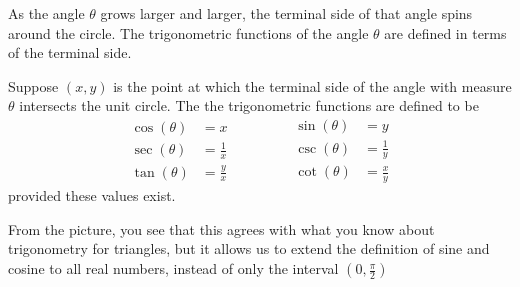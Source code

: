 \documentclass{ximera}
\begin{document}
\begin{image}
\end{image}
As the angle $\theta$ grows larger and larger, the terminal side of that angle spins around the circle.
The trigonometric functions of the angle $\theta$ are defined in terms of the terminal side.  
\begin{definition}
	Suppose $(x,y)$ is the point at which the terminal side of the angle with measure $\theta$ intersects the unit circle.
	The the trigonometric functions are defined to be
	\[\begin{aligned}
  		\cos(\theta) &= x\\
  		\sec(\theta) &= \frac{1}{x}\\
  		\tan(\theta) &= \frac{y}{x}\qquad
  	\end{aligned}
  	\qquad
  	\begin{aligned}
  		\sin(\theta) &= y\\
  		\csc(\theta) &= \frac{1}{y}\\
  		\cot(\theta) &= \frac{x}{y}    
	\end{aligned}\]
	provided these values exist.
\end{definition}
From the picture, you see that this agrees with what you know about trigonometry for triangles, but it allows us to extend the definition of sine and cosine to
all real numbers, instead of only the interval $\left( 0, \frac{\pi}{2} \right)$
  
\end{document}
